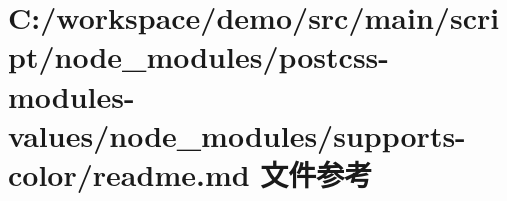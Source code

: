 \hypertarget{node__modules_2postcss-modules-values_2node__modules_2supports-color_2_r_e_a_d_m_e_8md}{}\section{C\+:/workspace/demo/src/main/script/node\+\_\+modules/postcss-\/modules-\/values/node\+\_\+modules/supports-\/color/readme.md 文件参考}
\label{node__modules_2postcss-modules-values_2node__modules_2supports-color_2_r_e_a_d_m_e_8md}
